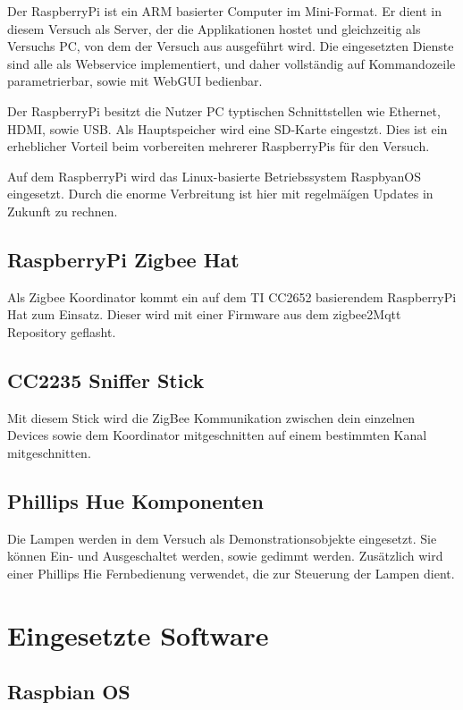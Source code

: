 Der RaspberryPi ist ein ARM basierter Computer im Mini-Format. Er dient in diesem Versuch als Server, der die Applikationen
hostet und gleichzeitig als Versuchs PC, von dem der Versuch aus ausgeführt wird. Die eingesetzten Dienste sind alle
als Webservice implementiert, und daher vollständig auf Kommandozeile parametrierbar, sowie mit WebGUI bedienbar.

Der RaspberryPi besitzt die Nutzer PC typtischen Schnittstellen wie Ethernet, HDMI, sowie USB. Als Hauptspeicher wird eine
SD-Karte eingestzt. Dies ist ein erheblicher Vorteil beim vorbereiten mehrerer RaspberryPis für den Versuch.

Auf dem RaspberryPi wird das Linux-basierte Betriebssystem RaspbyanOS eingesetzt. Durch die enorme Verbreitung ist
hier mit regelmäígen Updates in Zukunft zu rechnen.

\subsection{RaspberryPi Zigbee Hat}

Als Zigbee Koordinator kommt ein auf dem TI CC2652 basierendem RaspberryPi Hat zum Einsatz. Dieser wird mit einer Firmware aus dem zigbee2Mqtt Repository
geflasht. 

\subsection{CC2235 Sniffer Stick}

Mit diesem Stick wird die ZigBee Kommunikation zwischen dein einzelnen Devices sowie dem Koordinator mitgeschnitten auf einem bestimmten Kanal mitgeschnitten.

\subsection{Phillips Hue Komponenten}

Die Lampen werden in dem Versuch als Demonstrationsobjekte eingesetzt. Sie können Ein- und Ausgeschaltet werden, sowie gedimmt werden. Zusätzlich wird einer
Phillips Hie Fernbedienung verwendet, die zur Steuerung der Lampen dient.

\section{Eingesetzte Software}

\subsection{Raspbian OS}

